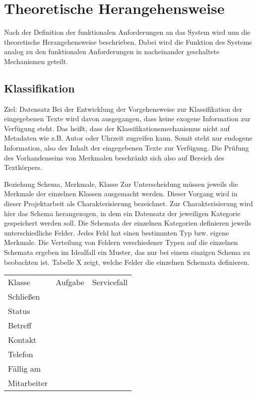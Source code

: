 \chapter{Theoretische Herangehensweise}
Nach der Definition der funktionalen Anforderungen an das System wird nun die theoretische Herangehensweise beschrieben. Dabei wird die Funktion des Systems analog zu den funktionalen Anforderungen in nacheinander geschaltete Mechanismen geteilt.

\section{Klassifikation}

Ziel: Datensatz
Bei der Entwicklung der Vorgehensweise zur Klassifikation der eingegebenen Texte wird davon ausgegangen, dass keine exogene Information zur Verfügung steht. Das heißt, dass der Klassifikationsmechanismus nicht auf Metadaten wie z.B. Autor oder Uhrzeit zugreifen kann. Somit steht nur endogene Information, also der Inhalt der eingegebenen Texte zur Verfügung. Die Prüfung des Vorhandenseins von Merkmalen beschränkt sich also auf Bereich des Textkörpers. \cite{sebastiano}

Beziehung Schema, Merkmale, Klasse
Zur Unterscheidung müssen jeweils die Merkmale der einzelnen Klassen ausgemacht werden. Dieser Vorgang wird in dieser Projektarbeit als Charakterisierung bezeichnet. Zur Charakterisierung wird hier das Schema herangezogen, in dem ein Datensatz der jeweiligen Kategorie gespeichert werden soll. Die Schemata der einzelnen Kategorien definieren jeweils unterschiedliche Felder. 
Jedes Feld hat einen bestimmten Typ bzw. eigene Merkmale.
Die Verteilung von Feldern verschiedener Typen auf die einzelnen Schemata ergeben im Idealfall ein Muster, das nur bei einem einzigen Schema zu beobachten ist.
Tabelle X zeigt, welche Felder die einzelnen Schemata definieren.

\begin{tabular}{lll}
    Klasse & Aufgabe & Servicefall \\
    Schließen \\
    Status \\
    Betreff \\
    Kontakt \\
    Telefon \\
    Fällig am \\
    Mitarbeiter \\
\end{tabular}

